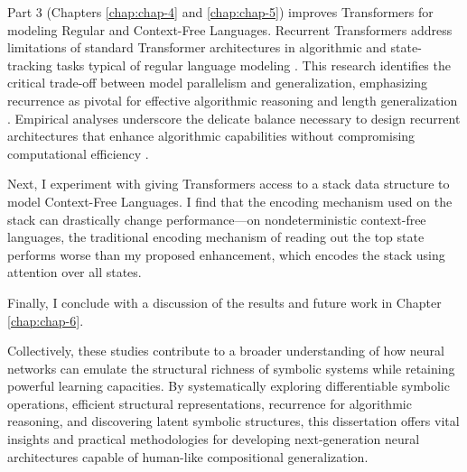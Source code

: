 Part 3 (Chapters \ref{chap:chap-4} and \ref{chap:chap-5}) improves Transformers for modeling Regular and Context-Free Languages. Recurrent Transformers address limitations of standard Transformer architectures in algorithmic and state-tracking tasks typical of regular language modeling \citep{deletang_neural_2022, merrill2024the}. This research identifies the critical trade-off between model parallelism and generalization, emphasizing recurrence as pivotal for effective algorithmic reasoning and length generalization \citep{soulos2024recurrent}. Empirical analyses underscore the delicate balance necessary to design recurrent architectures that enhance algorithmic capabilities without compromising computational efficiency \cite{ju_staircase_2022, hutchins_block-recurrent_2022}.

Next, I experiment with giving Transformers access to a stack data structure to model Context-Free Languages. I find that the encoding mechanism used on the stack can drastically change performance—on nondeterministic context-free languages, the traditional encoding mechanism of reading out the top state performs worse than my proposed enhancement, which encodes the stack using attention over all states.

Finally, I conclude with a discussion of the results and future work in Chapter \ref{chap:chap-6}. 

Collectively, these studies contribute to a broader understanding of how neural networks can emulate the structural richness of symbolic systems while retaining powerful learning capacities. By systematically exploring differentiable symbolic operations, efficient structural representations, recurrence for algorithmic reasoning, and discovering latent symbolic structures, this dissertation offers vital insights and practical methodologies for developing next-generation neural architectures capable of human-like compositional generalization.
